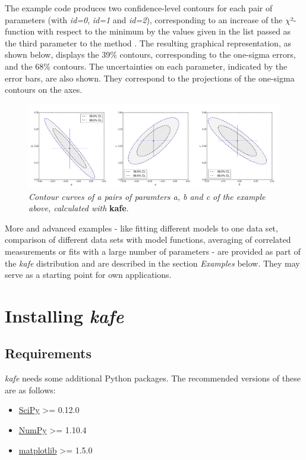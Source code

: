 \documentclass[a4paper,10pt,english]{sphinxmanual}
\begin{document}
The example code produces two confidence-level contours
for each pair of parameters (with \emph{id=0}, \emph{id=1} and \emph{id=2}),
corresponding to an increase of the \(\chi\)²-function
with respect to the minimum by the values given
in the list passed as the third parameter to the
method . The resulting
graphical representation, as shown below, displays the
39\% contours, corresponding to the one-sigma errors, and
the 68\% contours. The uncertainties on each parameter,
indicated by the error bars, are also shown. They
correspond to the projections of the one-sigma contours
on the axes.
\begin{figure}[htbp]
\centering
\capstart

\includegraphics{kafe_example0_contours.png}
\caption{\emph{Contour curves of a pairs of paramters a, b and c
of the example above, calculated with} \textbf{kafe}.}\end{figure}

More and advanced examples - like fitting different models
to one data set, comparison of different data sets with model
functions, averaging of correlated measurements or fits with
a large number of parameters -
are provided as part of the \emph{kafe} distribution and are
described in the section \emph{Examples} below. They may serve as
a starting point for own applications.


\chapter{Installing \emph{kafe}}
\label{installation:installing-kafe}\label{installation::doc}

\section{Requirements}
\label{installation:requirements}
\emph{kafe} needs some additional Python packages. The recommended versions of these are
as follows:
\begin{itemize}
\item {} 
\href{http://www.scipy.org}{SciPy} \textgreater{}= 0.12.0

\item {} 
\href{http://www.numpy.org}{NumPy} \textgreater{}= 1.10.4

\item {} 
\href{http://matplotlib.org}{matplotlib} \textgreater{}= 1.5.0

\end{itemize}
\end{document}
